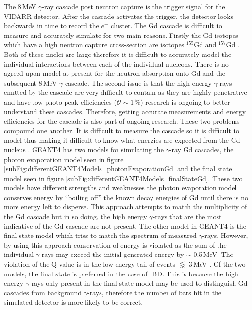 The 8\,MeV $\gamma$-ray cascade post neutron capture is the trigger signal for the VIDARR detector. After the cascade activates the trigger, the detector looks backwards in time to record the $e^+$ cluster. The Gd cascade is difficult to measure and accurately simulate for two main reasons. Firstly the Gd isotopes which have a high neutron capture cross-section are isotopes $^{155}$Gd and $^{157}$Gd \cite{molnar_2004}. Both of these nuclei are large therefore it is difficult to accurately model the individual interactions between each of the individual nucleons. There is no agreed-upon model at present for the neutron absorption onto Gd and the subsequent 8\,MeV $\gamma$ cascade. The second issue is that the high energy $\gamma$-rays emitted by the cascade are very difficult to contain as they are highly penetrative and have low photo-peak efficiencies ($\mathcal{O} \sim 1\,\%$) research is ongoing to better understand these cascades.  Therefore, getting accurate measurements and energy efficiencies for the cascade is also part of ongoing research. These two problems compound one another. It is difficult to measure the cascade so it is difficult to model thus making it difficult to know what energies are expected from the Gd nucleus \cite{molnar_2004}. 
GEANT4 has two models for simulating the $\gamma$-ray Gd cascades, the photon evaporation model seen in figure \ref{subFig:differentGEANT4Models_photonEvaporationGd} and the final state model seen in figure \ref{subFig:differentGEANT4Models_finalStateGd}. These two models have different strengths and weaknesses the photon evaporation model conserves energy by ``boiling off'' the known decay energies of Gd until there is no more energy left to disperse. This approach attempts to match the multiplicity of the Gd cascade but in so doing, the high energy $\gamma$-rays that are the most indicative of the Gd cascade are not present. The other model in GEANT4 is the final state model which tries to match the spectrum of measured $\gamma$-rays. However, by using this approach conservation of energy is violated as the sum of the individual $\gamma$-rays may exceed the initial generated energy by $\sim$ 0.5\,MeV. The violation of the Q-value is in the low energy tail of events $\lessapprox$ 3\,MeV \cite{YuChen_2015}. Of the two models, the final state is preferred in the case of IBD. This is because the high energy $\gamma$-rays only present in the final state model may be used to distinguish Gd cascades from background $\gamma$-rays, therefore the number of bars hit in the simulated detector is more likely to be correct. %

